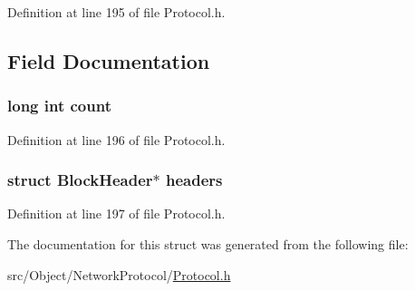 Definition at line 195 of file Protocol.h.



\subsection{Field Documentation}
\hypertarget{struct_headers_aabbb2f7768ed83b49f05e7911e3a693a}{
\subsubsection[{count}]{\setlength{\rightskip}{0pt plus 5cm}long int {\bf count}}}
\label{struct_headers_aabbb2f7768ed83b49f05e7911e3a693a}


Definition at line 196 of file Protocol.h.

\hypertarget{struct_headers_a0b894950328debae0613f43ca1f0dc64}{
\subsubsection[{headers}]{\setlength{\rightskip}{0pt plus 5cm}struct {\bf BlockHeader}$\ast$ {\bf headers}}}
\label{struct_headers_a0b894950328debae0613f43ca1f0dc64}


Definition at line 197 of file Protocol.h.



The documentation for this struct was generated from the following file:\begin{DoxyCompactItemize}
\item 
src/Object/NetworkProtocol/\hyperlink{_protocol_8h}{Protocol.h}\end{DoxyCompactItemize}
